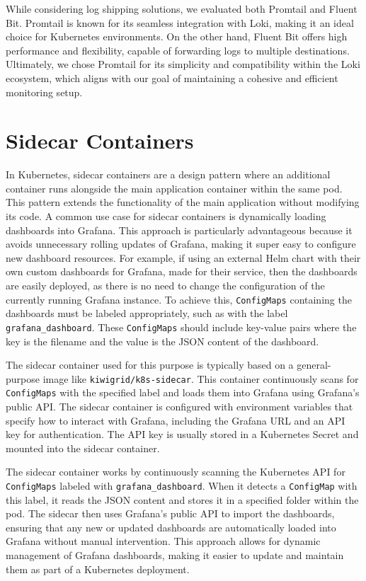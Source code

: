 While considering log shipping solutions, we evaluated both Promtail and Fluent Bit. Promtail is known for its seamless integration with Loki, making it an ideal choice for Kubernetes environments. On the other hand, Fluent Bit offers high performance and flexibility, capable of forwarding logs to multiple destinations. Ultimately, we chose Promtail for its simplicity and compatibility within the Loki ecosystem, which aligns with our goal of maintaining a cohesive and efficient monitoring setup.

\section{Sidecar Containers}
In Kubernetes, sidecar containers are a design pattern where an additional container runs alongside the main application container within the same pod. This pattern extends the functionality of the main application without modifying its code. A common use case for sidecar containers is dynamically loading dashboards into Grafana. This approach is particularly advantageous because it avoids unnecessary rolling updates of Grafana, making it super easy to configure new dashboard resources. For example, if using an external Helm chart with their own custom dashboards for Grafana, made for their service, then the dashboards are easily deployed, as there is no need to change the configuration of the currently running Grafana instance. To achieve this, \texttt{ConfigMaps} containing the dashboards must be labeled appropriately, such as with the label \texttt{grafana\_dashboard}. These \texttt{ConfigMaps} should include key-value pairs where the key is the filename and the value is the JSON content of the dashboard.

The sidecar container used for this purpose is typically based on a general-purpose image like \texttt{kiwigrid/k8s-sidecar}. This container continuously scans for \texttt{ConfigMaps} with the specified label and loads them into Grafana using Grafana's public API. The sidecar container is configured with environment variables that specify how to interact with Grafana, including the Grafana URL and an API key for authentication. The API key is usually stored in a Kubernetes Secret and mounted into the sidecar container.

The sidecar container works by continuously scanning the Kubernetes API for \texttt{ConfigMaps} labeled with \texttt{grafana\_dashboard}. When it detects a \texttt{ConfigMap} with this label, it reads the JSON content and stores it in a specified folder within the pod. The sidecar then uses Grafana's public API to import the dashboards, ensuring that any new or updated dashboards are automatically loaded into Grafana without manual intervention. This approach allows for dynamic management of Grafana dashboards, making it easier to update and maintain them as part of a Kubernetes deployment.

